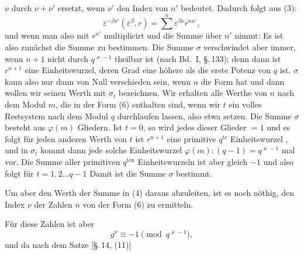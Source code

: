 $\nu$ durch $\nu + \nu'$ ersetzt, wenn $\nu'$ den Index von $n'$ bedeutet.
Dadurch folgt aus (3):
\[
\varepsilon^{-\beta \nu'} (\varepsilon^{\beta}, r) = \sum^{n} \varepsilon^{\beta \nu} r^{n n'},
\]
und wenn man also mit $r^{n'}$ multiplicirt und die Summe \"uber $n'$
nimmt:
Es ist also zun\"achst die Summe
zu bestimmen. Die Summe $\sigma$ verschwindet aber immer, wenn
$n + 1$ nicht durch $q^{\varkappa - 1}$ theilbar ist (nach Bd.\ I, \S.\,133); denn
dann ist $r^{n+1}$ eine Einheitswurzel, deren Grad eine h\"ohere als
die erste Potenz von $q$ ist. $\sigma$ kann also nur dann von Null verschieden
 sein, wenn $n$ die Form hat
und dann wollen wir seinen Werth mit $\sigma_t$ bezeichnen. Wir erhalten
 alle Werthe von $n$ nach dem Modul $m$, die in der Form
(6) enthalten sind, wenn wir $t$ ein volles Restsystem nach dem
Modul $q$ durchlaufen lassen, also etwa
setzen. Die Summe $\sigma$ besteht aus $\varphi(m)$ Gliedern. Ist $t = 0$, so
wird jedes dieser Glieder $= 1$ und es folgt
f\"ur jeden anderen Werth von $t$ ist $r^{n+1}$ eine primitive $q^{\text{te}}$ Einheitswurzel
, und in $\sigma_t$ kommt dann jede solche Einheitswurzel
$\varphi(m) : (q - 1) = q^{\varkappa - 1}$ mal vor. Die Summe aller primitiven
$q^{\text{ten}}$ Einheitswurzeln ist aber gleich $-1$ und also folgt f\"ur
$t = 1, 2 \ldots q - 1$
Damit ist die Summe $\sigma$ bestimmt.

Um aber den Werth der Summe in (4) daraus abzuleiten,
ist es noch n\"othig, den Index $\nu$ der Zahlen $n$ von der Form (6)
zu ermitteln.

F\"ur diese Zahlen ist aber
\[
g^{\nu} \equiv -1 \pmod{q^{\varkappa - 1}},
\]
und da nach dem  Satze [\S.\,14, (11)]
